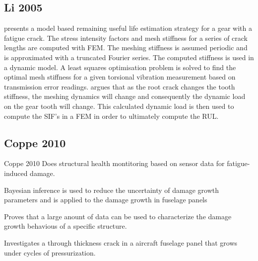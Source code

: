 \subsection{Li 2005}
\cite{Li2005a} presents a model based remaining useful life estimation strategy for a gear with a fatigue crack. The stress intensity factors and mesh stiffness for a series of crack lengths are computed with FEM. The meshing stiffness is assumed periodic and is approximated with a truncated Fourier series. The computed stiffness is used in a dynamic model. A least squares optimisation problem is solved to find the optimal mesh stiffness for a given torsional vibration measurement based on transmission error readings. \cite{Li2005a} argues that as the root crack changes the tooth stiffness, the meshing dynamics will change and consequently the dynamic load on the gear tooth will change. This calculated dynamic load is then used to compute the SIF's in a FEM in order to ultimately compute the RUL.




\subsection{Coppe 2010} %
Coppe 2010 Does structural health montitoring based on sensor data for fatigue-induced damage. 

Bayesian inference is used to reduce the uncertainty of damage growth parameters and is applied to the damage growth in fuselage panels

Proves that a large anount of data can be used to characterize the damage growth behavious of a specific structure.

Investigates a through thickness crack in a aircraft fuselage panel that grows under cycles of pressurization.



